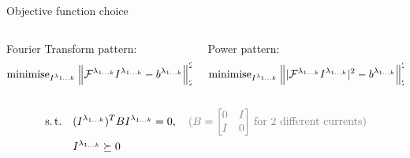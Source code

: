 \documentclass[../main.tex]{subfiles}
\begin{document}
\begin{frame}[t]{Objective function choice}

\begin{columns}[t]
\begin{column}{0.5\textwidth}
    Fourier Transform pattern:
    \begin{equation*}
    \operatorname{minimise}_{I^{\lambda_{1\ldots k}}} \Big\| \mathcal{F}^{\lambda_{1 \ldots k}} I^{\lambda_{1\ldots k}} - b^{\lambda_{1 \ldots k}} \Big\|_2^2
    \end{equation*}


\end{column}
\begin{column}{0.5\textwidth}
    Power pattern:
    \begin{equation*}
    \operatorname{minimise}_{I^{\lambda_{1\ldots k}}}  \Big\| |\mathcal{F}^{\lambda_{1 \ldots k}} I^{\lambda_{1\ldots k}}|^2 - b^{\lambda_{1 \ldots k}} \Big\|_2^2
    \end{equation*}
\end{column}
\end{columns}

\begin{equation*}
\begin{aligned}
& \st
& & (I^{\lambda_{1\ldots k}})^T B I^{\lambda_{1\ldots k}} = 0, \quad \text{\textcolor{gray}{($B=\begin{bmatrix} 0 & I \\ I & 0\end{bmatrix}$ for $2$ different currents)}} \\
&&& I^{\lambda_{1\ldots k}} \succeq 0 \\
\end{aligned}
\end{equation*}


\end{frame}
\end{document}
